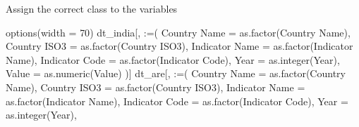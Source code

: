 \documentclass[
  8pt,
  ignorenonframetext,
]{beamer}
\newenvironment{Shaded}{\begin{snugshade}}{\end{snugshade}}
\newcommand{\AttributeTok}[1]{\textcolor[rgb]{0.40,0.45,0.13}{#1}}
\newcommand{\DecValTok}[1]{\textcolor[rgb]{0.68,0.00,0.00}{#1}}
\newcommand{\FunctionTok}[1]{\textcolor[rgb]{0.28,0.35,0.67}{#1}}
\newcommand{\NormalTok}[1]{\textcolor[rgb]{0.00,0.23,0.31}{#1}}
\newcommand{\OtherTok}[1]{\textcolor[rgb]{0.00,0.23,0.31}{#1}}
\newcommand{\StringTok}[1]{\textcolor[rgb]{0.13,0.47,0.30}{#1}}
\begin{document}
\begin{frame}[fragile]{Assign the correct class to the variables}
\begin{Shaded}
\begin{Highlighting}[]
\FunctionTok{options}\NormalTok{(}\AttributeTok{width =} \DecValTok{70}\NormalTok{)}
\NormalTok{dt\_india[, }\StringTok{\textasciigrave{}}\AttributeTok{:=}\StringTok{\textasciigrave{}}\NormalTok{(}
  \StringTok{\textasciigrave{}}\AttributeTok{Country Name}\StringTok{\textasciigrave{}} \OtherTok{=} \FunctionTok{as.factor}\NormalTok{(}\StringTok{\textasciigrave{}}\AttributeTok{Country Name}\StringTok{\textasciigrave{}}\NormalTok{),}
  \StringTok{\textasciigrave{}}\AttributeTok{Country ISO3}\StringTok{\textasciigrave{}} \OtherTok{=} \FunctionTok{as.factor}\NormalTok{(}\StringTok{\textasciigrave{}}\AttributeTok{Country ISO3}\StringTok{\textasciigrave{}}\NormalTok{),}
  \StringTok{\textasciigrave{}}\AttributeTok{Indicator Name}\StringTok{\textasciigrave{}} \OtherTok{=} \FunctionTok{as.factor}\NormalTok{(}\StringTok{\textasciigrave{}}\AttributeTok{Indicator Name}\StringTok{\textasciigrave{}}\NormalTok{),}
  \StringTok{\textasciigrave{}}\AttributeTok{Indicator Code}\StringTok{\textasciigrave{}} \OtherTok{=} \FunctionTok{as.factor}\NormalTok{(}\StringTok{\textasciigrave{}}\AttributeTok{Indicator Code}\StringTok{\textasciigrave{}}\NormalTok{),}
  \AttributeTok{Year =} \FunctionTok{as.integer}\NormalTok{(Year),}
  \AttributeTok{Value =} \FunctionTok{as.numeric}\NormalTok{(Value)}
\NormalTok{)]}
\NormalTok{dt\_are[, }\StringTok{\textasciigrave{}}\AttributeTok{:=}\StringTok{\textasciigrave{}}\NormalTok{(}
  \StringTok{\textasciigrave{}}\AttributeTok{Country Name}\StringTok{\textasciigrave{}} \OtherTok{=} \FunctionTok{as.factor}\NormalTok{(}\StringTok{\textasciigrave{}}\AttributeTok{Country Name}\StringTok{\textasciigrave{}}\NormalTok{),}
  \StringTok{\textasciigrave{}}\AttributeTok{Country ISO3}\StringTok{\textasciigrave{}} \OtherTok{=} \FunctionTok{as.factor}\NormalTok{(}\StringTok{\textasciigrave{}}\AttributeTok{Country ISO3}\StringTok{\textasciigrave{}}\NormalTok{),}
  \StringTok{\textasciigrave{}}\AttributeTok{Indicator Name}\StringTok{\textasciigrave{}} \OtherTok{=} \FunctionTok{as.factor}\NormalTok{(}\StringTok{\textasciigrave{}}\AttributeTok{Indicator Name}\StringTok{\textasciigrave{}}\NormalTok{),}
  \StringTok{\textasciigrave{}}\AttributeTok{Indicator Code}\StringTok{\textasciigrave{}} \OtherTok{=} \FunctionTok{as.factor}\NormalTok{(}\StringTok{\textasciigrave{}}\AttributeTok{Indicator Code}\StringTok{\textasciigrave{}}\NormalTok{),}
  \AttributeTok{Year =} \FunctionTok{as.integer}\NormalTok{(Year),}

\end{Highlighting}
\end{Shaded}
\end{frame}
\end{document}
